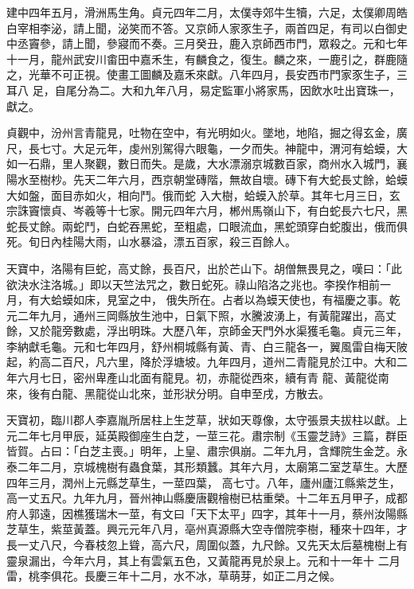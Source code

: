 \begin{pinyinscope}
 建中四年五月，滑洲馬生角。貞元四年二月，太僕寺郊牛生犢，六足，太僕卿周皓白宰相李泌，請上聞，泌笑而不答。又京師人家豕生子，兩首四足，有司以白御史中丞竇參，請上聞，參寢而不奏。三月癸丑，鹿入京師西市門，眾殺之。元和七年十一月，龍州武安川畬田中嘉禾生，有麟食之，復生。麟之來，一鹿引之，群鹿隨之，光華不可正視。使畫工圖麟及嘉禾來獻。八年四月，長安西市門家豕生子，三耳八
 足，自尾分為二。大和九年八月，易定監軍小將家馬，因飲水吐出寶珠一，獻之。



 貞觀中，汾州言青龍見，吐物在空中，有光明如火。墜地，地陷，掘之得玄金，廣尺，長七寸。大足元年，虔州別駕得六眼龜，一夕而失。神龍中，渭河有蛤蟆，大如一石鼎，里人聚觀，數日而失。是歲，大水漂溺京城數百家，商州水入城門，襄陽水至樹杪。先天二年六月，西京朝堂磚階，無故自壞。磚下有大蛇長丈餘，蛤蟆大如盤，面目赤如火，相向鬥。俄而蛇
 入大樹，蛤蟆入於草。其年七月三日，玄宗誅竇懷貞、岑羲等十七家。開元四年六月，郴州馬嶺山下，有白蛇長六七尺，黑蛇長丈餘。兩蛇鬥，白蛇吞黑蛇，至粗處，口眼流血，黑蛇頭穿白蛇腹出，俄而俱死。旬日內桂陽大雨，山水暴溢，漂五百家，殺三百餘人。



 天寶中，洛陽有巨蛇，高丈餘，長百尺，出於芒山下。胡僧無畏見之，嘆曰：「此欲決水注洛城。」即以天竺法咒之，數日蛇死。祿山陷洛之兆也。李揆作相前一月，有大蛤蟆如床，見室之中，
 俄失所在。占者以為蟆天使也，有福慶之事。乾元二年九月，通州三岡縣放生池中，日氣下照，水騰波湧上，有黃龍躍出，高丈餘，又於龍旁數處，浮出明珠。大歷八年，京師金天門外水渠獲毛龜。貞元三年，李納獻毛龜。元和七年四月，舒州桐城縣有黃、青、白三龍各一，翼風雷自梅天陂起，約高二百尺，凡六里，降於浮塘坡。九年四月，道州二青龍見於江中。大和二年六月七日，密州卑產山北面有龍見。初，赤龍從西來，續有青
 龍、黃龍從南來，後有白龍、黑龍從山北來，並形狀分明。自申至戌，方散去。



 天寶初，臨川郡人李嘉胤所居柱上生芝草，狀如天尊像，太守張景夫拔柱以獻。上元二年七月甲辰，延英殿御座生白芝，一莖三花。肅宗制《玉靈芝詩》三篇，群臣皆賀。占曰：「白芝主喪。」明年，上皇、肅宗俱崩。二年九月，含輝院生金芝。永泰二年二月，京城槐樹有蟲食葉，其形類蠶。其年六月，太廟第二室芝草生。大歷四年三月，潤州上元縣芝草生，一莖四葉，
 高七寸。八年，廬州廬江縣紫芝生，高一丈五尺。九年九月，晉州神山縣慶唐觀檜樹已枯重榮。十二年五月甲子，成都府人郭遠，因樵獲瑞木一莖，有文曰「天下太平」四字，其年十一月，蔡州汝陽縣芝草生，紫莖黃蓋。興元元年八月，亳州真源縣大空寺僧院李樹，種來十四年，才長一丈八尺，今春枝忽上聳，高六尺，周圍似蓋，九尺餘。又先天太后墓槐樹上有靈泉漏出，今年六月，其上有雲氣五色，又黃龍再見於泉上。元和十一年十
 二月雷，桃李俱花。長慶三年十二月，水不冰，草萌芽，如正二月之候。




\end{pinyinscope}
